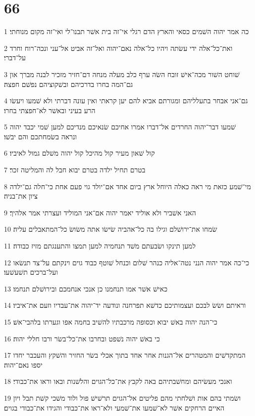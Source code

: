 \chapter{66}

\par 1 כה אמר יהוה השׁמים כסאי והארץ הדם רגלי אי־זה בית אשׁר תבנו־לי ואי־זה מקום מנוחתי׃
\par 2 ואת־כל־אלה ידי עשׂתה ויהיו כל־אלה נאם־יהוה ואל־זה אביט אל־עני ונכה־רוח וחרד על־דברי׃
\par 3 שׁוחט השׁור מכה־אישׁ זובח השׂה ערף כלב מעלה מנחה דם־חזיר מזכיר לבנה מברך און גם־המה בחרו בדרכיהם ובשׁקוציהם נפשׁם חפצה׃
\par 4 גם־אני אבחר בתעלליהם ומגורתם אביא להם יען קראתי ואין עונה דברתי ולא שׁמעו ויעשׂו הרע בעיני ובאשׁר לא־חפצתי בחרו׃
\par 5 שׁמעו דבר־יהוה החרדים אל־דברו אמרו אחיכם שׂנאיכם מנדיכם למען שׁמי יכבד יהוה ונראה בשׂמחתכם והם יבשׁו׃
\par 6 קול שׁאון מעיר קול מהיכל קול יהוה משׁלם גמול לאיביו׃
\par 7 בטרם תחיל ילדה בטרם יבוא חבל לה והמליטה זכר׃
\par 8 מי־שׁמע כזאת מי ראה כאלה היוחל ארץ ביום אחד אם־יולד גוי פעם אחת כי־חלה גם־ילדה ציון את־בניה׃
\par 9 האני אשׁביר ולא אוליד יאמר יהוה אם־אני המוליד ועצרתי אמר אלהיך׃
\par 10 שׂמחו את־ירושׁלם וגילו בה כל־אהביה שׂישׂו אתה משׂושׂ כל־המתאבלים עליה׃
\par 11 למען תינקו ושׂבעתם משׁד תנחמיה למען תמצו והתענגתם מזיז כבודה׃
\par 12 כי־כה אמר יהוה הנני נטה־אליה כנהר שׁלום וכנחל שׁוטף כבוד גוים וינקתם על־צד תנשׂאו ועל־ברכים תשׁעשׁעו׃
\par 13 כאישׁ אשׁר אמו תנחמנו כן אנכי אנחמכם ובירושׁלם תנחמו׃
\par 14 וראיתם ושׂשׂ לבכם ועצמותיכם כדשׁא תפרחנה ונודעה יד־יהוה את־עבדיו וזעם את־איביו׃
\par 15 כי־הנה יהוה באשׁ יבוא וכסופה מרכבתיו להשׁיב בחמה אפו וגערתו בלהבי־אשׁ׃
\par 16 כי באשׁ יהוה נשׁפט ובחרבו את־כל־בשׂר ורבו חללי יהוה׃
\par 17 המתקדשׁים והמטהרים אל־הגנות אחר אחד בתוך אכלי בשׂר החזיר והשׁקץ והעכבר יחדו יספו נאם־יהוה׃
\par 18 ואנכי מעשׂיהם ומחשׁבתיהם באה לקבץ את־כל־הגוים והלשׁנות ובאו וראו את־כבודי׃
\par 19 ושׂמתי בהם אות ושׁלחתי מהם פליטים אל־הגוים תרשׁישׁ פול ולוד משׁכי קשׁת תבל ויון האיים הרחקים אשׁר לא־שׁמעו את־שׁמעי ולא־ראו את־כבודי והגידו את־כבודי בגוים׃
